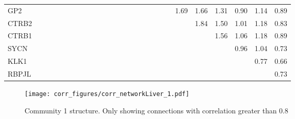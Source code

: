 \begin{longtable}{lrrrrrrrrrrrrrrrrrrrrrrrrr}
GP2      &              &              &              &              &             &             &             &             &            &            &            &            &             &           &             &                &             &               &           &        1.69 &        1.66 &       1.31 &       0.90 &        1.14 &        0.89 \\
CTRB2    &              &              &              &              &             &             &             &             &            &            &            &            &             &           &             &                &             &               &           &             &        1.84 &       1.50 &       1.01 &        1.18 &        0.83 \\
CTRB1    &              &              &              &              &             &             &             &             &            &            &            &            &             &           &             &                &             &               &           &             &             &       1.56 &       1.06 &        1.18 &        0.89 \\
SYCN     &              &              &              &              &             &             &             &             &            &            &            &            &             &           &             &                &             &               &           &             &             &            &       0.96 &        1.04 &        0.73 \\
KLK1     &              &              &              &              &             &             &             &             &            &            &            &            &             &           &             &                &             &               &           &             &             &            &            &        0.77 &        0.66 \\
RBPJL    &              &              &              &              &             &             &             &             &            &            &            &            &             &           &             &                &             &               &           &             &             &            &            &             &        0.73 \\
\end{longtable}


\begin{figure}[h!]
\centering
\texttt{[image: corr\_figures/corr\_networkLiver\_1.pdf]}
\caption{Community 1 structure. Only showing connections with correlation greater than 0.8}
\end{figure}


